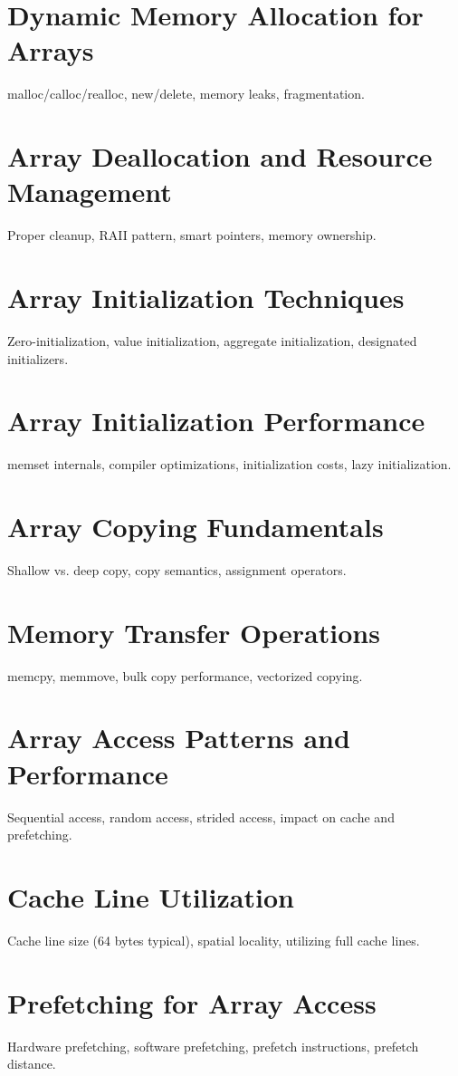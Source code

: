 \chapter{Dynamic Memory Allocation for Arrays}
malloc/calloc/realloc, new/delete, memory leaks, fragmentation.

\chapter{Array Deallocation and Resource Management}
Proper cleanup, RAII pattern, smart pointers, memory ownership.

\chapter{Array Initialization Techniques}
Zero-initialization, value initialization, aggregate initialization, designated initializers.

\chapter{Array Initialization Performance}
memset internals, compiler optimizations, initialization costs, lazy initialization.

\chapter{Array Copying Fundamentals}
Shallow vs. deep copy, copy semantics, assignment operators.

\chapter{Memory Transfer Operations}
memcpy, memmove, bulk copy performance, vectorized copying.

\chapter{Array Access Patterns and Performance}
Sequential access, random access, strided access, impact on cache and prefetching.

\chapter{Cache Line Utilization}
Cache line size (64 bytes typical), spatial locality, utilizing full cache lines.

\chapter{Prefetching for Array Access}
Hardware prefetching, software prefetching, prefetch instructions, prefetch distance.

